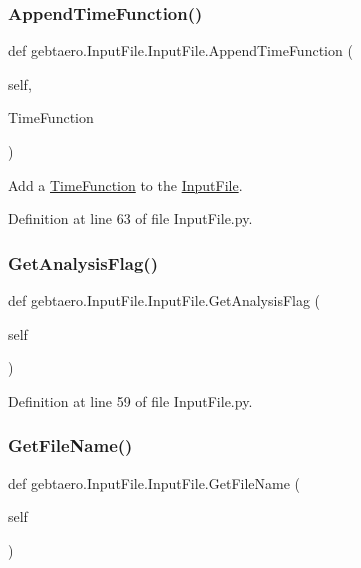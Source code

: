\subsubsection{\texorpdfstring{Append\+Time\+Function()}{AppendTimeFunction()}}
{\footnotesize\ttfamily def gebtaero.\+Input\+File.\+Input\+File.\+Append\+Time\+Function (\begin{DoxyParamCaption}\item[{}]{self,  }\item[{}]{Time\+Function }\end{DoxyParamCaption})}



Add a \hyperlink{namespacegebtaero_1_1_time_function}{Time\+Function} to the \hyperlink{classgebtaero_1_1_input_file_1_1_input_file}{Input\+File}. 



Definition at line 63 of file Input\+File.\+py.

\mbox{\label{classgebtaero_1_1_input_file_1_1_input_file_a8d9a4bed8ff821455af85d5440329fe8}} 
\subsubsection{\texorpdfstring{Get\+Analysis\+Flag()}{GetAnalysisFlag()}}
{\footnotesize\ttfamily def gebtaero.\+Input\+File.\+Input\+File.\+Get\+Analysis\+Flag (\begin{DoxyParamCaption}\item[{}]{self }\end{DoxyParamCaption})}



Definition at line 59 of file Input\+File.\+py.

\mbox{\label{classgebtaero_1_1_input_file_1_1_input_file_a3fe8f05410f29d9c555adbee5dae9e16}} 
\subsubsection{\texorpdfstring{Get\+File\+Name()}{GetFileName()}}
{\footnotesize\ttfamily def gebtaero.\+Input\+File.\+Input\+File.\+Get\+File\+Name (\begin{DoxyParamCaption}\item[{}]{self }\end{DoxyParamCaption})}



